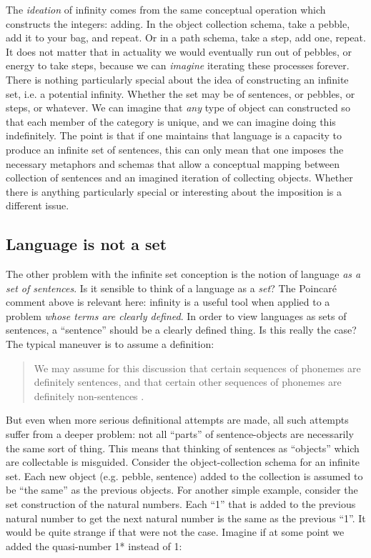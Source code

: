   The \textit{ideation} of infinity comes from the same conceptual operation which constructs the integers: adding. In the object collection schema, take a pebble, add it to your bag, and repeat. Or in a path schema, take a step, add one, repeat. It does not matter that in actuality we would eventually run out of pebbles, or energy to take steps, because we can \textit{imagine} iterating these processes forever. There is nothing particularly special about the idea of constructing an infinite set, i.e. a potential infinity. Whether the set may be of sentences, or pebbles, or steps, or whatever. We can imagine that \textit{any} type of object can constructed so that each member of the category is unique, and we can imagine doing this indefinitely. The point is that if one maintains that language is a capacity to produce an infinite set of sentences, this can only mean that one imposes the necessary metaphors and schemas that allow a conceptual mapping between collection of sentences and an imagined iteration of collecting objects. Whether there is anything particularly special or interesting about the imposition is a different issue.

\subsection{Language is not a set}

The other problem with the infinite set conception is the notion of language \textit{as a set of sentences}. Is it sensible to think of a language as a \textit{set}? The Poincaré comment above is relevant here: infinity is a useful tool when applied to a problem \textit{whose terms are clearly defined}. In order to view languages as sets of sentences, a “sentence” should be a clearly defined thing. Is this really the case? The typical maneuver is to assume a definition:

\begin{quote}
We may assume for this discussion that certain sequences of phonemes are definitely sentences, and that certain other sequences of phonemes are definitely non-sentences \citep[14]{Chomsky1957}.
\end{quote}

  But even when more serious definitional attempts are made, all such attempts suffer from a deeper problem: not all “parts” of sentence-objects are necessarily the same sort of thing. This means that thinking of sentences as “objects” which are collectable is misguided. Consider the object-collection schema for an infinite set. Each new object (e.g. pebble, sentence) added to the collection is assumed to be “the same” as the previous objects. For another simple example, consider the set construction of the natural numbers. Each “1” that is added to the previous natural number to get the next natural number is the same as the previous “1”. It would be quite strange if that were not the case. Imagine if at some point we added the quasi-number 1* instead of 1:

